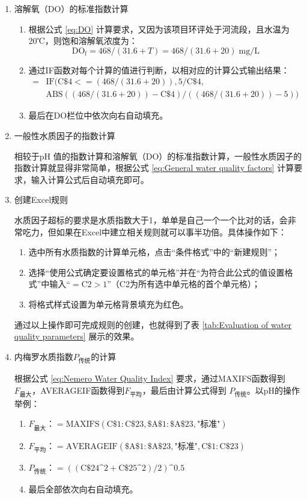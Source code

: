 \begin{enumerate}
    \item 溶解氧（DO）的标准指数计算
    \begin{enumerate}[label=(\arabic*)]
        \item 根据公式 \ref{eq:DO} 计算要求，又因为该项目环评处于河流段，且水温为20℃，则饱和溶解氧浓度为：
        $$\mathrm{DO_f}=468/(31.6+T)=468/(31.6+20) \;\text{mg/L}$$ 
        \item 通过IF函数对每个计算的值进行判断，以相对应的计算公式输出结果：
        \begin{align*}
            = & \mathrm{IF(C\$4<=(468/(31.6+20)),5/C\$4,} \\
            & \mathrm{ABS((468/(31.6+20))-C\$4)/((468/(31.6+20))-5))}
        \end{align*}
        \item 最后在DO栏位中依次向右自动填充。
    \end{enumerate}
    
    \item 一般性水质因子的指数计算
    
    相较于pH 值的指数计算和溶解氧（DO）的标准指数计算，一般性水质因子的指数计算就显得非常简单，根据公式 \ref{eq:General water quality factors} 计算要求，输入计算公式后自动填充即可。

    \item 创建Excel规则
    
    水质因子超标的要求是水质指数大于1，单单是自己一个一个比对的话，会非常吃力，但如果在Excel中建立相关规则就可以事半功倍。具体操作如下：
    \begin{enumerate}[label=(\arabic*)]
        \item 选中所有水质指数的计算单元格，点击“条件格式”中的“新建规则”；
        \item 选择“使用公式确定要设置格式的单元格”并在“为符合此公式的值设置格式”中输入“$\mathrm{=C2>1}$”（C2为所有选中单元格的首个单元格）；
        \item 将格式样式设置为单元格背景填充为红色。
    \end{enumerate}
    通过以上操作即可完成规则的创建，也就得到了表 \ref{tab:Evaluation of water quality parameters} 展示的效果。

    \item 内梅罗水质指数$P_{\text{传统}}$的计算
    
    根据公式 \ref{eq:Nemero Water Quality Index} 要求，通过MAXIFS函数得到$F_{\text{最大}}$，AVERAGEIF函数得到$F_{\text{平均}}$，最后由计算公式得到 $P_{\text{传统}}$。以pH的操作举例：
    \begin{enumerate}[label=(\arabic*)]
        \item $F_{\text{最大}}$：$\mathrm{=MAXIFS(C\$1:C\$23,\$A\$1:\$A\$23,\text{"标准"})}$
        \item $F_{\text{平均}}$：$\mathrm{=AVERAGEIF(\$A\$1:\$A\$23,\text{"标准"},C\$1:C\$23)}$
        \item $P_{\text{传统}}$：$\mathrm{=((C\$24\text{\textasciicircum} 2+C\$25\text{\textasciicircum} 2)/2)\text{\textasciicircum} 0.5}$
        \item 最后全部依次向右自动填充。
    \end{enumerate}
\end{enumerate}

